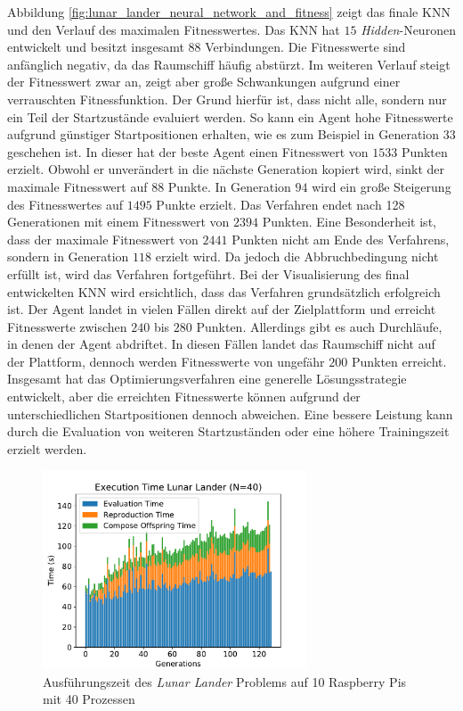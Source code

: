 Abbildung \ref{fig:lunar_lander_neural_network_and_fitness} zeigt das finale \ac{KNN} und den Verlauf des maximalen Fitnesswertes. Das \ac{KNN} hat $15$ \emph{Hidden}-Neuronen entwickelt und besitzt insgesamt $88$ Verbindungen. Die Fitnesswerte sind anfänglich negativ, da das Raumschiff häufig abstürzt. Im weiteren Verlauf steigt der Fitnesswert zwar an, zeigt aber große Schwankungen aufgrund einer verrauschten Fitnessfunktion. Der Grund hierfür ist, dass nicht alle, sondern nur ein Teil der Startzustände evaluiert werden. So kann ein Agent hohe Fitnesswerte aufgrund günstiger Startpositionen erhalten, wie es zum Beispiel in Generation $33$ geschehen ist. In dieser hat der beste Agent einen Fitnesswert von $1533$ Punkten erzielt. Obwohl er unverändert in die nächste Generation kopiert wird, sinkt der maximale Fitnesswert auf $88$ Punkte. In Generation $94$ wird ein große Steigerung des Fitnesswertes auf $1495$ Punkte erzielt. Das Verfahren endet nach 128 Generationen mit einem Fitnesswert von $2394$ Punkten. Eine Besonderheit ist, dass der maximale Fitnesswert von $2441$ Punkten nicht am Ende des Verfahrens, sondern in Generation $118$ erzielt wird. 
Da jedoch die Abbruchbedingung nicht erfüllt ist, wird das Verfahren fortgeführt. Bei der Visualisierung des final entwickelten \ac{KNN} wird ersichtlich, dass das Verfahren grundsätzlich erfolgreich ist. Der Agent landet in vielen Fällen direkt auf der Zielplattform und erreicht Fitnesswerte zwischen $240$ bis $280$ Punkten. Allerdings gibt es auch Durchläufe, in denen der Agent abdriftet. In diesen Fällen landet das Raumschiff nicht auf der Plattform, dennoch werden Fitnesswerte von ungefähr $200$ Punkten erreicht. Insgesamt hat das Optimierungsverfahren eine generelle Lösungsstrategie entwickelt, aber die erreichten Fitnesswerte können aufgrund der unterschiedlichen Startpositionen dennoch abweichen. Eine bessere Leistung kann durch die Evaluation von weiteren Startzuständen oder eine höhere Trainingszeit erzielt werden.
\begin{figure}[!h]
	\centering
	\includegraphics[width=0.7\textwidth]{./img/lunar_lander/lunar_lander_time_40.pdf} 
	\caption{Ausführungszeit des \emph{Lunar Lander} Problems auf 10 Raspberry Pis mit 40 Prozessen}
	\label{fig:lunar_lander_time_40core_10pi}
\end{figure}
